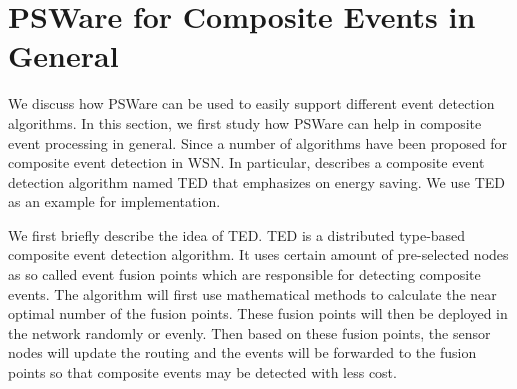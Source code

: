 \section{PSWare for Composite Events in General}
We discuss how PSWare can be used to easily support different event detection algorithms. In this section, we first study how PSWare can help in composite event processing in general. Since a number of algorithms have been proposed for composite event detection in WSN. In particular, \cite{lai:ted} describes a composite event detection algorithm named TED that emphasizes on energy saving. We use TED as an example for implementation.

We first briefly describe the idea of TED. TED is a distributed type-based composite event detection algorithm. It uses certain amount of pre-selected nodes as so called event fusion points which are responsible for detecting composite events. The algorithm will first use mathematical methods to calculate the near optimal number of the fusion points. These fusion points will then be deployed in the network randomly or evenly. Then based on these fusion points, the sensor nodes will update the routing and the events will be forwarded to the fusion points so that composite events may be detected with less cost.

